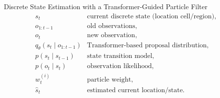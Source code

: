 \begin{frame}[allowframebreaks]{Discrete State Estimation with a Transformer-Guided Particle Filter}
        \[
            \begin{array}{ll}
                s_t & \text{current discrete state (location cell/region)}, \\
                o_{1:t-1} & \text{old observations}, \\
                o_t & \text{new observation}, \\
                q_{\theta}(s_t \mid o_{1:t-1}) & \text{Transformer-based proposal distribution}, \\
                p(s_t \mid s_{t-1}) & \text{state transition model}, \\
                p(o_t \mid s_t) & \text{observation likelihood}, \\
                w_t^{(i)} & \text{particle weight}, \\
                \hat{s}_t & \text{estimated current location/state}.
            \end{array}
        \]
\end{frame}